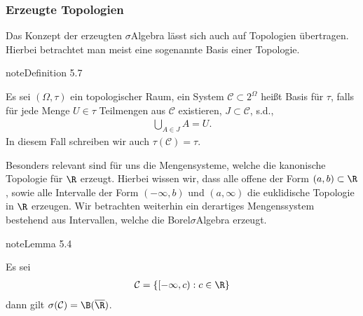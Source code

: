 \documentclass[letterpaper,10pt,german]{jupyterBook}
\begin{document}
\subsubsection{Erzeugte Topologien}
\label{\detokenize{masstheorie/masstheorie:erzeugte-topologien}}\label{\detokenize{masstheorie/masstheorie:s-gentop}}
\sphinxAtStartPar
Das Konzept der erzeugten \(\sigma\)\sphinxhyphen{}Algebra lässt sich auch auf Topologien übertragen. Hierbei betrachtet man meist eine sogenannte Basis einer Topologie.
\label{masstheorie/masstheorie:definition-12}
\begin{sphinxadmonition}{note}{Definition 5.7}



\sphinxAtStartPar
Es sei \((\Omega,\tau)\) ein topologischer Raum, ein System \(\mathcal{C}\subset 2^\Omega\) heißt Basis für \(\tau\), falls für jede Menge \(U\in\tau\) Teilmengen aus \(\mathcal{C}\) existieren, \(J\subset\mathcal{C}\), s.d.,
\begin{equation*}
\begin{split}\bigcup_{A\in J} A = U.\end{split}
\end{equation*}
\sphinxAtStartPar
In diesem Fall schreiben wir auch \(\tau(\mathcal{C})=\tau\).
\end{sphinxadmonition}

\sphinxAtStartPar
Besonders relevant sind für uns die Mengensysteme, welche die kanonische Topologie für \(\R\) erzeugt. Hierbei wissen wir, dass alle offene  der Form \((a,b)\subset \R\), sowie alle Intervalle der Form \((-\infty, b)\) und \((a, \infty)\) die euklidische Topologie in \(\R\) erzeugen. Wir betrachten weiterhin ein derartiges Mengenssystem bestehend aus Intervallen, welche die Borel\sphinxhyphen{}\(\sigma\)\sphinxhyphen{}Algebra erzeugt.
\label{masstheorie/masstheorie:lem:genborel}
\begin{sphinxadmonition}{note}{Lemma 5.4}



\sphinxAtStartPar
Es sei
\begin{equation*}
\begin{split}\mathcal{C} = \{ [-\infty, c):c\in\R\}\end{split}
\end{equation*}
\sphinxAtStartPar
dann gilt \(\sigma(\mathcal{C}) = \B(\overline{\R})\).
\end{sphinxadmonition}
\end{document}
